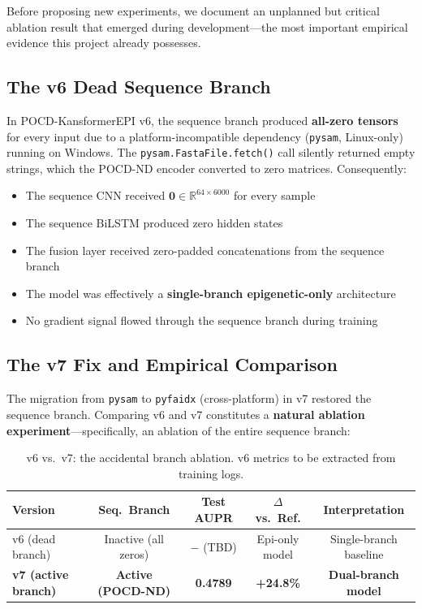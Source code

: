 \documentclass[11pt,a4paper]{article}
\begin{document}
Before proposing new experiments, we document an unplanned but critical ablation result that emerged during development---the most important empirical evidence this project already possesses.

\subsection{The v6 Dead Sequence Branch}

In POCD-KansformerEPI v6, the sequence branch produced \textbf{all-zero tensors} for every input due to a platform-incompatible dependency (\texttt{pysam}, Linux-only) running on Windows. The \texttt{pysam.FastaFile.fetch()} call silently returned empty strings, which the POCD-ND encoder converted to zero matrices. Consequently:

\begin{itemize}
    \item The sequence CNN received $\mathbf{0} \in \mathbb{R}^{64 \times 6000}$ for every sample
    \item The sequence BiLSTM produced zero hidden states
    \item The fusion layer received zero-padded concatenations from the sequence branch
    \item The model was effectively a \textbf{single-branch epigenetic-only} architecture
    \item No gradient signal flowed through the sequence branch during training
\end{itemize}

\subsection{The v7 Fix and Empirical Comparison}

The migration from \texttt{pysam} to \texttt{pyfaidx} (cross-platform) in v7 restored the sequence branch. Comparing v6 and v7 constitutes a \textbf{natural ablation experiment}---specifically, an ablation of the entire sequence branch:

\begin{table}[H]
\centering
\begin{tabular}{lcccc}
\toprule
\textbf{Version} & \textbf{Seq.\ Branch} & \textbf{Test AUPR} & \textbf{$\Delta$ vs.\ Ref.} & \textbf{Interpretation} \\
\midrule
v6 (dead branch) & Inactive (all zeros) & $-$ (TBD) & Epi-only model & Single-branch baseline \\
\rowcolor{lightgray}
\textbf{v7 (active branch)} & \textbf{Active (POCD-ND)} & \textbf{0.4789} & \textbf{+24.8\%} & \textbf{Dual-branch model} \\
\bottomrule
\end{tabular}
\caption{v6 vs.\ v7: the accidental branch ablation. v6 metrics to be extracted from training logs.}
\end{table}
\end{document}
